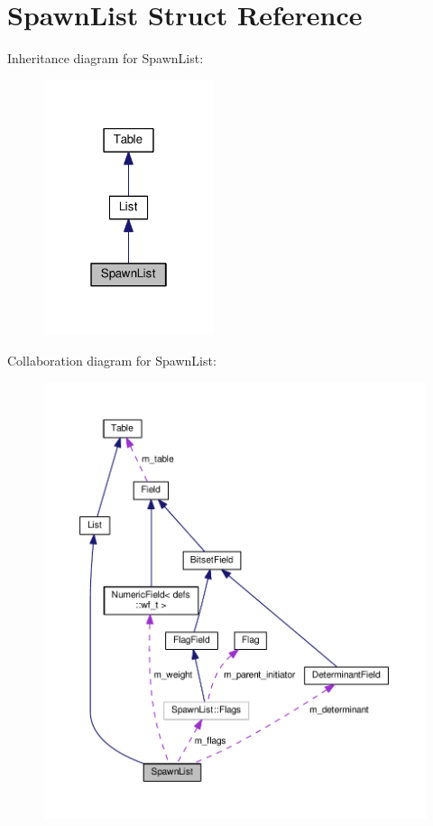 \hypertarget{structSpawnList}{}\section{Spawn\+List Struct Reference}
\label{structSpawnList}


Inheritance diagram for Spawn\+List\+:\nopagebreak
\begin{figure}[H]
\begin{center}
\leavevmode
\includegraphics[width=142pt]{structSpawnList__inherit__graph}
\end{center}
\end{figure}


Collaboration diagram for Spawn\+List\+:\nopagebreak
\begin{figure}[H]
\begin{center}
\leavevmode
\includegraphics[width=350pt]{structSpawnList__coll__graph}
\end{center}
\end{figure}

